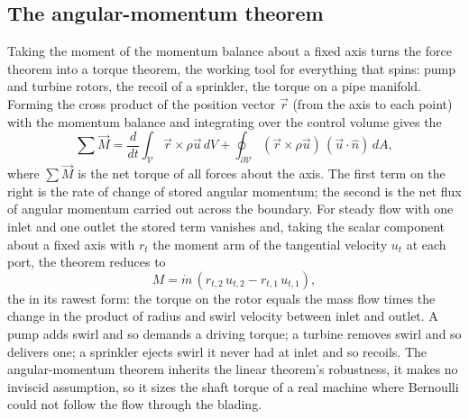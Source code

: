 \subsection{The angular-momentum theorem}

Taking the moment of the momentum balance about a fixed axis turns the
force theorem into a torque theorem, the working tool for everything
that spins: pump and turbine rotors, the recoil of a sprinkler, the
torque on a pipe manifold. Forming the cross product of the position
vector $\vec r$ (from the axis to each point) with the momentum balance
and integrating over the control volume gives the
\[
\sum \vec{M}
= \frac{d}{dt}\int_{\mathcal{V}} \vec r\times\rho\vec{u}\,dV
+ \oint_{\partial\mathcal{V}}
(\vec r\times\rho\vec{u})\,(\vec{u}\cdot\hat{n})\,dA,
\]
where $\sum\vec M$ is the net torque of all forces about the axis. The
first term on the right is the rate of change of stored angular
momentum; the second is the net flux of angular momentum carried out
across the boundary. For steady flow with one inlet and one outlet the
stored term vanishes and, taking the scalar component about a fixed
axis with $r_t$ the moment arm of the tangential velocity $u_t$ at each
port, the theorem reduces to
\[
M = \dot m\,(r_{t,2}\,u_{t,2} - r_{t,1}\,u_{t,1}),
\]
the  in its rawest form: the
torque on the rotor equals the mass flow times the change in the
product of radius and swirl velocity between inlet and outlet. A pump
adds swirl and so demands a driving torque; a turbine removes swirl and
so delivers one; a sprinkler ejects swirl it never had at inlet and so
recoils. The angular-momentum theorem inherits the linear theorem's
robustness, it makes no inviscid assumption, so it sizes the shaft
torque of a real machine where Bernoulli could not follow the flow
through the blading.

